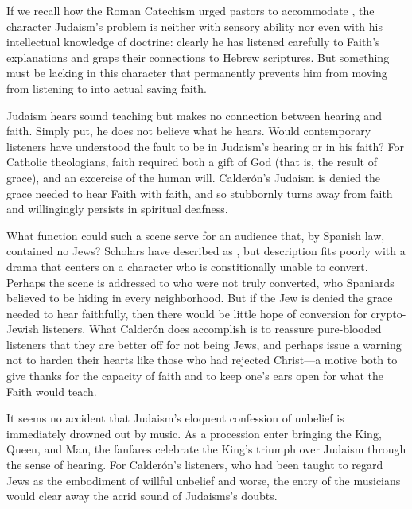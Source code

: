 If we recall how the Roman Catechism urged pastors to accommodate , the character Judaism's problem is neither with sensory ability nor even with his intellectual knowledge of doctrine: clearly he has listened carefully to Faith's explanations and graps their connections to Hebrew scriptures.
But something must be lacking in this character that permanently prevents him from moving from listening to  into actual saving faith.

Judaism hears sound teaching but makes no connection between hearing and faith. 
Simply put, he does not believe what he hears.
Would contemporary listeners have understood the fault to be in Judaism's hearing or in his faith?
For Catholic theologians, faith required both a gift of God (that is, the result of grace), and an excercise of the human will.\citXXX{}
Calderón's Judaism is denied the grace needed to hear Faith with faith, and so stubbornly turns away from faith and willingingly persists in spiritual deafness.

What function could such a scene serve for an audience that, by Spanish law, contained no Jews?
Scholars have described  as \citXXX[Wardropper?], but description fits poorly with a drama that centers on a character who is constitionally unable to convert.
Perhaps the scene is addressed to  who were not truly converted, who Spaniards believed to be hiding in every neighborhood.
But if the Jew is denied the grace needed to hear faithfully, then there would be little hope of conversion for crypto-Jewish listeners.
What Calderón does accomplish is to reassure pure-blooded listeners that they are better off for not being Jews, and perhaps issue a warning not to harden their hearts like those who had rejected Christ---a motive both to give thanks for the capacity of faith and to keep one's ears open for what the Faith would teach.

It seems no accident that Judaism's eloquent confession of unbelief is immediately drowned out by music.
As a procession enter bringing the King, Queen, and Man, the fanfares  celebrate the King's triumph over Judaism through the sense of hearing.
For Calderón's listeners, who had been taught to regard Jews as the embodiment of willful unbelief and worse, the entry of the musicians would clear away the acrid sound of Judaisms's doubts.

